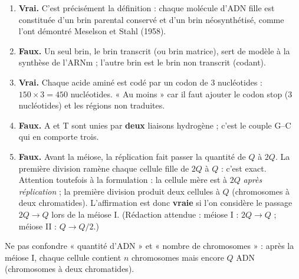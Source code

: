 \documentclass[11pt]{article}
\newcommand{\cle}[1]{{\popxbold\color{popdark}#1}}
\begin{document}
\begin{corrige}
\begin{enumerate}
\item \textbf{Vrai.} C'est précisément la définition : chaque molécule d'ADN fille est constituée d'un brin parental conservé et d'un brin néosynthétisé, comme l'ont démontré Meselson et Stahl (1958).
\item \textbf{Faux.} Un seul brin, le \cle{brin transcrit} (ou brin matrice), sert de modèle à la synthèse de l'ARNm ; l'autre brin est le brin non transcrit (codant).
\item \textbf{Vrai.} Chaque acide aminé est codé par un codon de 3 nucléotides : $150 \times 3 = 450$ nucléotides. « Au moins » car il faut ajouter le codon stop (3 nucléotides) et les régions non traduites.
\item \textbf{Faux.} A et T sont unies par \textbf{deux} liaisons hydrogène ; c'est le couple G--C qui en comporte trois.
\item \textbf{Faux.} Avant la méiose, la réplication fait passer la quantité de $Q$ à $2Q$. La première division ramène chaque cellule fille de $2Q$ à $Q$ : c'est exact. Attention toutefois à la formulation : la cellule mère est à $2Q$ \emph{après réplication} ; la première division produit deux cellules à $Q$ (chromosomes à deux chromatides). L'affirmation est donc \textbf{vraie} si l'on considère le passage $2Q \rightarrow Q$ lors de la méiose I. (Rédaction attendue : méiose I : $2Q \rightarrow Q$ ; méiose II : $Q \rightarrow Q/2$.)
\end{enumerate}
\begin{attention}
Ne pas confondre « quantité d'ADN » et « nombre de chromosomes » : après la méiose I, chaque cellule contient $n$ chromosomes mais encore $Q$ ADN (chromosomes à deux chromatides).
\end{attention}
\end{corrige}
\end{document}

